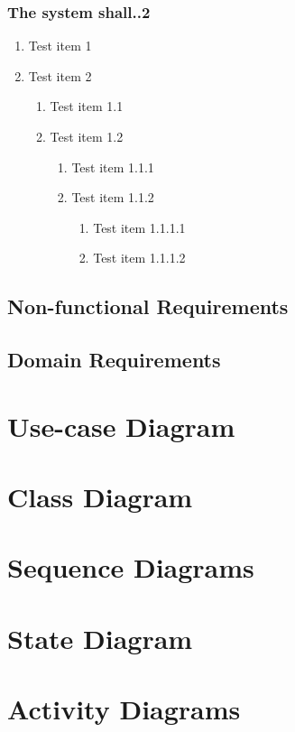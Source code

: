 \documentclass[12pt]{article}
\newenvironment{requirement}[1]
{
    \renewcommand{\thesubsubsection}{R\arabic{subsubsection}.}
    \renewcommand{\labelenumi}{
        \arabic{subsubsection}.\arabic{enumi}
    }
    \renewcommand{\labelenumii}{
        \arabic{subsubsection}.\arabic{enumi}.\arabic{enumii}
    }
    \renewcommand{\labelenumiii}{
        \arabic{subsubsection}.\arabic{enumi}.\arabic{enumii}.\arabic{enumiii}
    }
    \renewcommand{\labelenumiv}{
        \arabic{subsubsection}.\arabic{enumi}.\arabic{enumii}.\arabic{enumiii}.\arabic{enumiv}
    }
    \subsubsection{#1}
}
{}
\begin{document}
\begin{enumerate}
\begin{enumerate}
\begin{requirement}{The system shall..2}
\begin{enumerate}
    \item Test item 1
    \item Test item 2
    \begin{enumerate}
        \item Test item 1.1
        \item Test item 1.2
        \begin{enumerate}
            \item Test item 1.1.1
            \item Test item 1.1.2
            \begin{enumerate}
                \item Test item 1.1.1.1
                \item Test item 1.1.1.2
            \end{enumerate}
        \end{enumerate}
    \end{enumerate}
\end{enumerate}


\end{requirement}

\subsection{Non-functional Requirements}

\subsection{Domain Requirements}

\section{Use-case Diagram}

\section{Class Diagram}

\section{Sequence Diagrams}

\section{State Diagram}

\section{Activity Diagrams}


\end{enumerate}
\end{enumerate}
\end{document}
